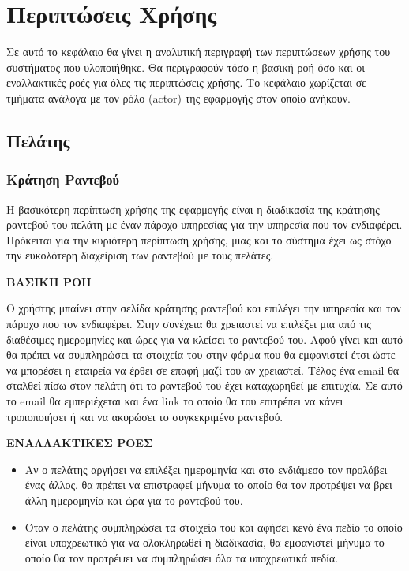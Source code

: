 
\chapter{Περιπτώσεις Χρήσης}
Σε αυτό το κεφάλαιο θα γίνει η αναλυτική περιγραφή των περιπτώσεων χρήσης του συστήματος που υλοποιήθηκε. Θα περιγραφούν τόσο η βασική ροή όσο και οι εναλλακτικές ροές για όλες τις περιπτώσεις χρήσης. Το κεφάλαιο χωρίζεται σε τμήματα ανάλογα με τον ρόλο (actor) της εφαρμογής στον οποίο ανήκουν.

\section{Πελάτης}
\subsection{Κράτηση Ραντεβού}
Η βασικότερη περίπτωση χρήσης της εφαρμογής είναι η διαδικασία της κράτησης ραντεβού του πελάτη με έναν πάροχο υπηρεσίας για την υπηρεσία που τον ενδιαφέρει. Πρόκειται για την κυριότερη περίπτωση χρήσης, μιας και το σύστημα έχει ως στόχο την ευκολότερη διαχείριση των ραντεβού με τους πελάτες. 

\textbf{ΒΑΣΙΚΗ ΡΟΗ}

Ο χρήστης μπαίνει στην σελίδα κράτησης ραντεβού και επιλέγει την υπηρεσία και τον πάροχο που τον ενδιαφέρει. Στην συνέχεια θα χρειαστεί να επιλέξει μια από τις διαθέσιμες ημερομηνίες και ώρες για να κλείσει το ραντεβού του. Αφού γίνει και αυτό θα πρέπει να συμπληρώσει τα στοιχεία του στην φόρμα που θα εμφανιστεί έτσι ώστε να μπορέσει η εταιρεία να έρθει σε επαφή μαζί του αν χρειαστεί. Τέλος ένα email θα σταλθεί πίσω στον πελάτη ότι το ραντεβού του έχει καταχωρηθεί με επιτυχία. Σε αυτό το email θα εμπεριέχεται και ένα link το οποίο θα του επιτρέπει να κάνει τροποποιήσει ή και να ακυρώσει το συγκεκριμένο ραντεβού.

\textbf{ΕΝΑΛΛΑΚΤΙΚΕΣ ΡΟΕΣ}

\begin{itemize}
\item Αν ο πελάτης αργήσει να επιλέξει ημερομηνία και στο ενδιάμεσο τον προλάβει ένας άλλος, θα πρέπει να επιστραφεί μήνυμα το οποίο θα τον προτρέψει να βρει άλλη ημερομηνία και ώρα για το ραντεβού του.
\item Όταν ο πελάτης συμπληρώσει τα στοιχεία του και αφήσει κενό ένα πεδίο το οποίο είναι υποχρεωτικό για να ολοκληρωθεί η διαδικασία, θα εμφανιστεί μήνυμα το οποίο θα τον προτρέψει να συμπληρώσει όλα τα υποχρεωτικά πεδία.
\end{itemize}

